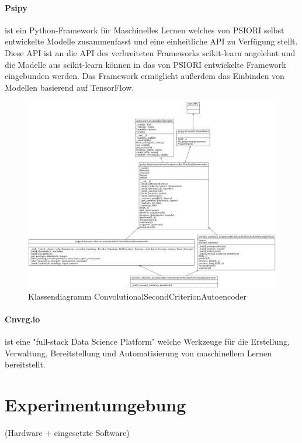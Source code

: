 		\paragraph{Psipy} ist ein Python-Framework für Maschinelles Lernen welches von PSIORI selbst entwickelte Modelle zusammenfasst und eine einheitliche API zu Verfügung stellt. Diese API ist an die API des verbreiteten Frameworks scikit-learn angelehnt und die Modelle aus scikit-learn können in das von PSIORI entwickelte Framework eingebunden werden. Das Framework ermöglicht außerdem das Einbinden von Modellen basierend auf TensorFlow.\grqq [PSIORI]
		
			\begin{figure}[h]
			\centering
			\includegraphics[width=\textwidth, center]{bilder/Grundlagen/Klassen_CSCA.png}
			\caption[Klassendiagramm ConvolutionalSecondCriterionAutoencoder]{Klassendiagramm ConvolutionalSecondCriterionAutoencoder}
			\label{img:ConvolutionalSecondCriterionAutoencoder}
		\end{figure}
		
		\paragraph{Cnvrg.io}  ist eine "full-stack Data Science Platform" welche Werkzeuge  für die Erstellung, Verwaltung, Bereitstellung  und Automatisierung von maschinellem Lernen bereitstellt. 
			
	\section{Experimentumgebung}
	\label{sec:Experimentumgebung}
		(Hardware + eingesetzte Software)